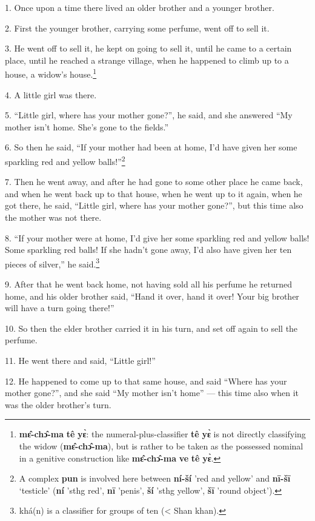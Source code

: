\setcounter{footnote}{0}

1. Once upon a time there lived an older brother and a younger brother.

2. First the younger brother, carrying some perfume, went off to sell it.

3. He went off to sell it, he kept on going to sell it, until he came to a certain
place, until he reached a strange village, when he happened to climb up to a house,
a widow's house.\footnote{\textbf{mɛ̂-chɔ̂-ma} \textbf{tê} \textbf{yɛ̀}: the numeral-plus-classifier \textbf{tê} \textbf{yɛ̀} is not directly classifying the widow (\textbf{mɛ̂-chɔ̂-ma}), but is rather to be taken as the possessed nominal in a genitive construction like \textbf{mɛ̂-chɔ̂-ma} \textbf{ve} \textbf{tê} \textbf{yɛ̀}.}

4. A little girl was there.

5. ``Little girl, where has your mother gone?'', he said, and she answered ``My
mother isn't home. She's gone to the fields.''

6. So then he said, ``If your mother had been at home, I'd have given her some sparkling
red and yellow balls!''\footnote{A complex \textbf{pun} is involved here between \textbf{ní-ší} 'red and yellow' and \textbf{nī-šī} `testicle' (\textbf{ní} 'sthg red', \textbf{nī} 'penis', \textbf{ší} 'sthg yellow', \textbf{šī} 'round object').}

7. Then he went away, and after he had gone to some other place he came back, and
when he went back up to that house, when he went up to it again, when he got there,
he said, ``Little girl, where has your mother gone?'', but this time also the mother
was not there.

8. ``If your mother were at home, I'd give her some sparkling red and yellow balls!
Some sparkling red balls! If she hadn't gone away, I'd also have given her ten
pieces of silver,'' he said.\footnote{khá(n) is a classifier for groups of ten (< Shan khan).}

9. After that he went back home, not having sold all his perfume he returned home,
and his older brother said, ``Hand it over, hand it over! Your big brother will
have a turn going there!''

10. So then the elder brother carried it in his turn, and set off again to sell
the perfume.

11. He went there and said, ``Little girl!''

12. He happened to come up to that same house, and said ``Where has your mother
gone?'', and she said ``My mother isn't home'' --- this time also when it was the
older brother's turn.

